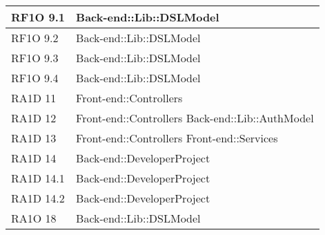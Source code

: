 \begin{center}
\begin{longtable}{|p{3cm}|p{5cm}|}
      RF1O 9.1 & Back-end::Lib::DSLModel \\ \hline
      RF1O 9.2 & Back-end::Lib::DSLModel \\ \hline
      RF1O 9.3 & Back-end::Lib::DSLModel \\ \hline
      RF1O 9.4 & Back-end::Lib::DSLModel \\ \hline
      RA1D 11 & Front-end::Controllers \\ \hline
      RA1D 12 & Front-end::Controllers \newline     
      			Back-end::Lib::AuthModel \\ \hline
      RA1D 13 & Front-end::Controllers \newline
      			Front-end::Services \\ \hline
      RA1D 14 &	Back-end::DeveloperProject \\ \hline
      RA1D 14.1 & Back-end::DeveloperProject \\ \hline
      RA1D 14.2 & Back-end::DeveloperProject \\ \hline
      RA1O 18 & Back-end::Lib::DSLModel \\ \hline
		      
       \end{longtable}
      \egroup
      \end{center}  
\clearpage